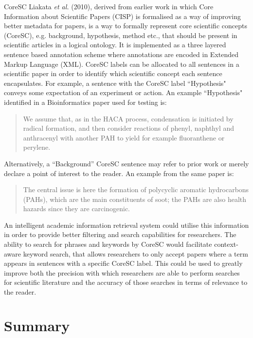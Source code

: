 CoreSC Liakata \emph{et al.} (2010), derived from earlier work in which Core
Information about Scientific Papers (CISP) is formalised as a way of improving
better metadata for papers\cite{soldatova2007ontology}, is a way to formally
represent core scientific concepts (CoreSC), e.g. background, hypothesis,
method etc., that should be present in scientific articles in a logical
ontology\cite{LIAKATA10.644}. It is implemented as a three layered sentence
based annotation scheme  where annotations are encoded in Extended Markup
Language (XML). CoreSC labels can be allocated to all sentences in a
scientific paper in order to identify which scientific concept each sentence
encapsulates. For example, a sentence with the CoreSC label ``Hypothesis"
conveys some expectation of an experiment or action. An example ``Hypothesis"
identified in a Bioinformatics paper used for testing is:

\begin{quotation}
We assume that, as in the HACA process, condensation is initiated by radical
formation, and then consider reactions of phenyl, naphthyl and anthracenyl with
another PAH to yield for example fluoranthene or
perylene\cite{unterreiner2004reaction}.
\end{quotation}

Alternatively, a ``Background'' CoreSC sentence may refer to prior work or
merely declare a point of interest to the reader. An example from the same
paper is:

\begin{quotation}
The central issue is here the formation of polycyclic aromatic hydrocarbons
(PAHs), which are the main constituents of soot; the PAHs are also health
hazards since they are carcinogenic\cite{unterreiner2004reaction}.
\end{quotation}

An intelligent academic information retrieval system could utilise this
information in order to provide better filtering and search capabilities for
researchers. The ability to search for phrases and keywords by CoreSC would
facilitate context-aware keyword search, that allows researchers to only accept
papers where a term appears in sentences with a specific CoreSC label. This
could be used to greatly improve both the precision with which researchers are
able to perform searches for scientific literature and the accuracy of those
searches in terms of relevance to the reader.

\section{Summary}


